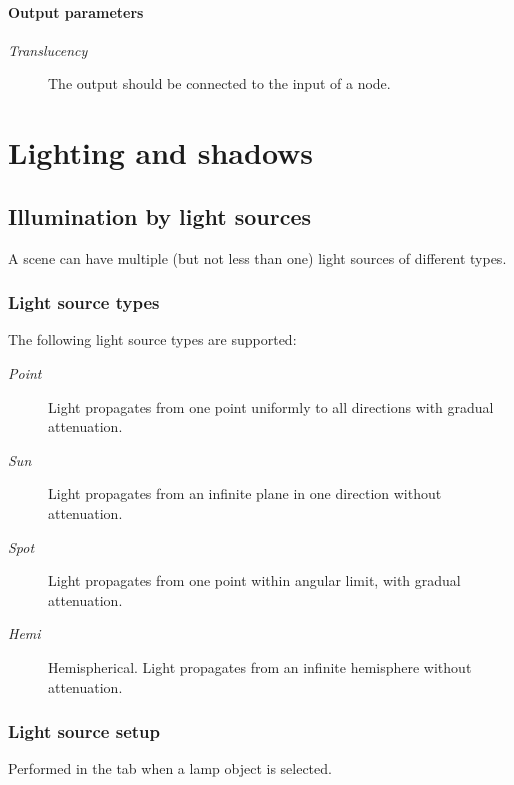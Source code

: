 \documentclass[a4paper,12pt,oneside]{sphinxmanual}
\begin{document}
\subsubsection{Output parameters}
\label{node_materials:id7}\begin{description}
\item[{\emph{Translucency}}] \leavevmode
The output should be connected to the  input of a  node.

\end{description}
\label{lighting:lighting}

\chapter{Lighting and shadows}
\label{lighting:index-0}\label{lighting::doc}\label{lighting:id1}

\section{Illumination by light sources}
\label{lighting:id2}\label{lighting:index-1}
A scene can have multiple (but not less than one) light sources of different types.


\subsection{Light source types}
\label{lighting:id3}
The following light source types are supported:
\begin{description}
\item[{\emph{Point}}] \leavevmode
Light propagates from one point uniformly to all directions with gradual attenuation.

\item[{\emph{Sun}}] \leavevmode
Light propagates from an infinite plane in one direction without attenuation.

\item[{\emph{Spot}}] \leavevmode
Light propagates from one point within angular limit, with gradual attenuation.

\item[{\emph{Hemi}}] \leavevmode
Hemispherical. Light propagates from an infinite hemisphere without attenuation.

\end{description}


\subsection{Light source setup}
\label{lighting:id4}
Performed in the  tab when a lamp object is selected.
\end{document}
